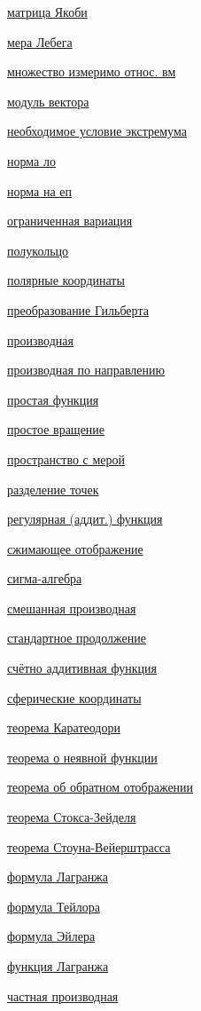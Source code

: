 \documentclass[a4paper]{article}
\theoremstyle{indented}
\theoremstyle{definition}
\theoremstyle{remark}
\begin{document}
\begin{multicols}{2}
    \hyperlink{23}{матрица Якоби} \ 

    \hyperlink{61}{мера Лебега} \ 

    \hyperlink{56}{множество измеримо относ. вм} \ 

    \hyperlink{13}{модуль вектора} \ 

    \hyperlink{26}{необходимое условие экстремума} \ 

    \hyperlink{16}{норма ло} \ 

    \hyperlink{12}{норма на еп} \ 

    \hyperlink{2}{ограниченная вариация} \ 

    \hyperlink{45}{полукольцо} \ 

    \hyperlink{32}{полярные координаты} \ 

    \hyperlink{43}{преобразование Гильберта} \ 

    \hyperlink{15}{производная} \ 

    \hyperlink{19}{производная по направлению} \ 

    \hyperlink{48}{простая функция} \ 

    \hyperlink{10}{простое вращение} \ 

    \hyperlink{64}{пространство с мерой} \ 

    \hyperlink{39}{разделение точек} \ 

    \hyperlink{51}{регулярная (аддит.) функция} \ 

    \hyperlink{41}{сжимающее отображение} \ 

    \hyperlink{52}{сигма-алгебра} \ 

    \hyperlink{24}{смешанная производная} \ 

    \hyperlink{59}{стандартное продолжение} \ 

    \hyperlink{50}{счётно аддитивная функция} \ 

    \hyperlink{33}{сферические координаты} \ 

    \hyperlink{57}{теорема Каратеодори} \ 

    \hyperlink{31}{теорема о неявной функции} \ 

    \hyperlink{21}{теорема об обратном отображении} \ 

    \hyperlink{36}{теорема Стокса-Зейделя} \ 

    \hyperlink{40}{теорема Стоуна-Вейерштрасса} \ 

    \hyperlink{8}{формула Лагранжа} \ 

    \hyperlink{25}{формула Тейлора} \ 

    \hyperlink{11}{формула Эйлера} \ 

    \hyperlink{35}{функция Лагранжа} \ 

    \hyperlink{17}{частная производная} \ 

\end{multicols}
\end{document}
